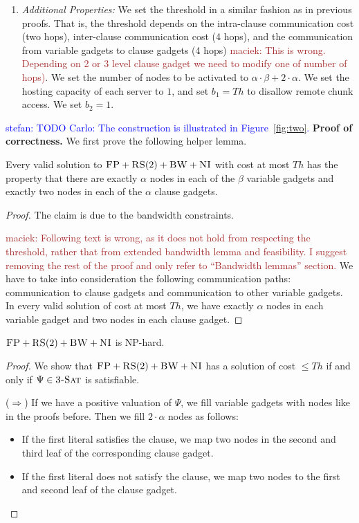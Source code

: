 \documentclass[9pt]{sigcomm-alternate}
\newcommand{\maciek}[1]{\textcolor{brown}{maciek: #1}}
\newcommand{\stefan}[1]{\textcolor{blue}{stefan: #1}}
\newcommand{\clauses}{\alpha}
\newcommand{\vars}{\beta}
\newcommand{\CC}{\textsc{NI}}
\newcommand{\FP}{\textsc{FP}}
\newcommand{\RS}{\textsc{RS}}
\newcommand{\BW}{\textsc{BW}}
\newcommand{\CostTrans}{\ensuremath{b_1}}
\newcommand{\CostCom}{\ensuremath{b_2}}
\newcommand{\TSAT}{\textsc{3-Sat}}
\newcommand{\Formula}{\ensuremath{\Psi}}
\newcommand{\Thr}{\ensuremath{Th}}
\begin{document}
\begin{appendix}
\begin{enumerate}
  \item \emph{Additional Properties:} We set the threshold in a
    similar fashion as in previous proofs. That is,
the threshold depends on the intra-clause communication cost (two hops),
inter-clause communication cost (4 hops),
  and the communication from variable gadgets to clause gadgets (4 hops) \maciek{This is wrong. Depending on 2 or 3 level clause gadget we need to modify one of number of hops)}. We
  set the number of nodes to be activated to $\clauses \cdot \vars + 2 \cdot
  \clauses$. We set the hosting capacity of each server to $1$, and set
  $\CostTrans = \Thr$ to disallow remote chunk access. We set $\CostCom = 1$.


 \end{enumerate}

\stefan{TODO Carlo: The construction is illustrated in Figure~\ref{fig:two}.}
\textbf{Proof of correctness.}
We first prove the following helper lemma.
\begin{lemma}
Every valid solution to $\FP+\RS(2)+\BW+\CC$
with cost at most $\Thr$ has the property that
there are exactly $\clauses$ nodes in each of the $\vars$ variable gadgets
and exactly two nodes in each of the $\clauses$ clause gadgets.
\end{lemma}
\begin{proof}
The claim is due to the bandwidth constraints.

\maciek{Following text is wrong, as it does not hold from respecting the threshold, rather that from extended bandwidth lemma and feasibility. I suggest removing the rest of the proof and only refer to ``Bandwidth lemmas'' section.}
We have to take into
consideration the following communication paths:
communication to clause gadgets and
communication to
other variable gadgets.
In every valid solution of cost at most $\Thr$, we have exactly
$\clauses$ nodes in each variable gadget and two nodes in each clause gadget.
\end{proof}


\begin{theorem}
$\FP+\RS(2)+\BW+\CC$ is NP-hard.
\end{theorem}
\begin{proof}
We show that $\FP+\RS(2)+\BW+\CC$ has a solution of cost $\leq
  \Thr$ if and only if $\Formula\in \TSAT$ is satisfiable.

($\Rightarrow$) If we have a positive valuation of $\Formula$, we fill variable gadgets with nodes like in
the proofs before. Then we fill $2 \cdot \clauses$ nodes as follows:
\begin{itemize}
\item If the first literal satisfies the clause, we map two nodes in the second and
third leaf of the corresponding clause gadget.
\item If the first literal does not satisfy the clause, we map two nodes to the first
and second leaf of the clause gadget.
\end{itemize}


\end{proof}
\end{appendix}
\end{document}

